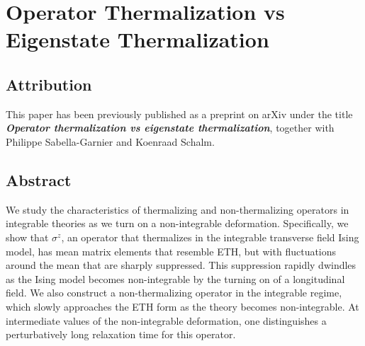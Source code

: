 \chapter{Operator Thermalization vs Eigenstate Thermalization}
\label{ch:therm}

\section*{Attribution}
This paper has been previously published as a preprint on arXiv under the title \textbf{\textit{Operator thermalization vs eigenstate thermalization}}, together with Philippe Sabella-Garnier and Koenraad Schalm.\cite{bukva2019operator}

\section*{Abstract}
We study the characteristics of thermalizing and non-thermalizing operators in integrable theories as we turn on a non-integrable deformation. Specifically, we show that $\sigma^z$, an operator that thermalizes in the integrable transverse field Ising model, has mean matrix elements that resemble ETH, but with fluctuations around the mean that are sharply suppressed. This suppression rapidly dwindles as the Ising model becomes non-integrable by the turning on of a longitudinal field. We also construct a non-thermalizing operator in the integrable regime, which slowly approaches the ETH form as the theory becomes non-integrable. At intermediate values of the non-integrable deformation, one distinguishes a perturbatively long relaxation time for this operator.

